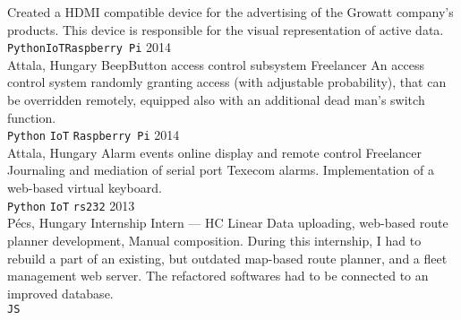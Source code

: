 \documentclass[9pt]{developercv} %
\begin{document}
\begin{entrylist}
        {Created a HDMI compatible device for the advertising of the Growatt company’s products. This device is responsible
            for the visual representation of active data.
            \\ \texttt{Python}\slashsep\texttt{IoT}\slashsep\texttt{Raspberry Pi}}
    \entry
        {2014 \\ Attala, Hungary}
        {BeepButton access control subsystem}
        {Freelancer}
        {An access control system randomly granting access (with adjustable probability), that can be overridden remotely,
            equipped also with an additional dead man’s switch function.\\
            \texttt{Python}\slashsep
            \texttt{IoT}\slashsep
            \texttt{Raspberry Pi}
        }
    \entry
        {2014 \\ Attala, Hungary}
        {Alarm events online display and remote control}
        {Freelancer}
        {Journaling and mediation of serial port Texecom alarms. Implementation of a web-based virtual keyboard.\\
            \texttt{Python}\slashsep
            \texttt{IoT}\slashsep
            \texttt{rs232}
        }
    \entry
        {2013 \\ Pécs, Hungary}
        {Internship}
        {Intern --- HC Linear}
        {Data uploading, web-based route planner development, Manual composition. During this internship, I had to rebuild a
            part of an existing, but outdated map-based route planner, and a fleet management web server. The refactored
            softwares had to be connected to an improved database.\\
            \texttt{JS}
        }
\end{entrylist}

\end{document}
